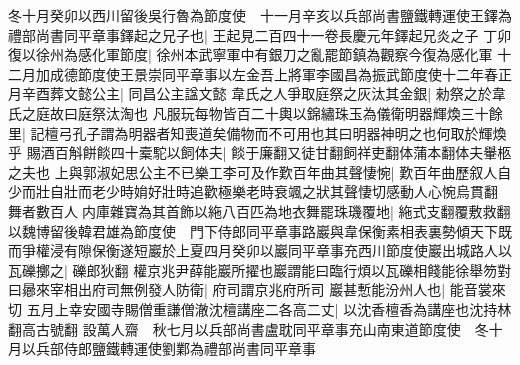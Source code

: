 冬十月癸卯以西川留後吳行魯為節度使　十一月辛亥以兵部尚書鹽鐵轉運使王鐸為禮部尚書同平章事鐸起之兄子也|{
	王起見二百四十一卷長慶元年鐸起兄炎之子}
丁卯復以徐州為感化軍節度|{
	徐州本武寧軍中有銀刀之亂罷節鎮為觀察今復為感化軍}
十二月加成德節度使王景崇同平章事以左金吾上將軍李國昌為振武節度使十二年春正月辛酉葬文懿公主|{
	同昌公主諡文懿}
韋氏之人爭取庭祭之灰汰其金銀|{
	勑祭之於韋氏之庭故曰庭祭汰淘也}
凡服玩每物皆百二十輿以錦繡珠玉為儀衛明器輝煥三十餘里|{
	記檀弓孔子謂為明器者知喪道矣備物而不可用也其曰明器神明之也何取於輝煥乎}
賜酒百斛餅餤四十槖駝以飼体夫|{
	餤于廉翻又徒甘翻飼祥吏翻体蒲本翻体夫轝柩之夫也}
上與郭淑妃思公主不已樂工李可及作歎百年曲其聲悽惋|{
	歎百年曲歷叙人自少而壯自壯而老少時姢好壯時追歡極樂老時衰颯之狀其聲悽切感動人心惋烏貫翻}
舞者數百人内庫雜寶為其首飾以絁八百匹為地衣舞罷珠璣覆地|{
	絁式支翻覆敷救翻}
以魏博留後韓君雄為節度使　門下侍郎同平章事路巖與韋保衡素相表裏勢傾天下既而爭權浸有隙保衡遂短巖於上夏四月癸卯以巖同平章事充西川節度使巖出城路人以瓦礫擲之|{
	礫郎狄翻}
權京兆尹薛能巖所擢也巖謂能曰臨行煩以瓦礫相餞能徐舉笏對曰曏來宰相出府司無例發人防衛|{
	府司謂京兆府所司}
巖甚慙能汾州人也|{
	能音裳來切}
五月上幸安國寺賜僧重謙僧澈沈檀講座二各高二丈|{
	以沈香檀香為講座也沈持林翻高古號翻}
設萬人齋　秋七月以兵部尚書盧耽同平章事充山南東道節度使　冬十月以兵部侍郎鹽鐵轉運使劉鄴為禮部尚書同平章事

